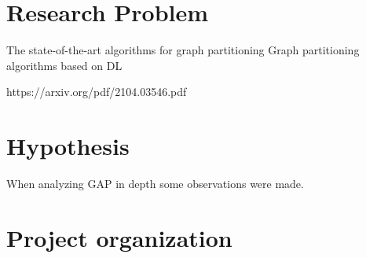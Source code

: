 \section{Research Problem}
The state-of-the-art algorithms for graph partitioning 
Graph partitioning algorithms based on DL

https://arxiv.org/pdf/2104.03546.pdf
\section{Hypothesis}
When analyzing GAP in depth some observations were made.

\section{Project organization}

